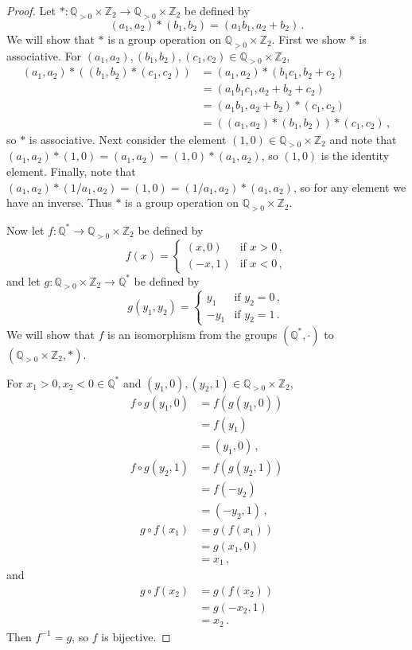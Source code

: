 \documentclass{abrice}
\newcommand{\Z}{\mathbb{Z}}
\newcommand{\Q}{\mathbb{Q}}
\begin{document}
\begin{proof}
  Let $* : \Q_{>0} \times \Z_2 \to \Q_{>0} \times \Z_2$ be defined by
  \[
    (a_1, a_2) * (b_1, b_2) = (a_1 b_1, a_2 + b_2)\, .
  \]
  We will show that $*$ is a group operation on $\Q_{>0} \times \Z_2$. First we
  show $*$ is associative. For
  $(a_1, a_2), (b_1, b_2), (c_1, c_2) \in \Q_{>0} \times \Z_2$,
  \begin{align*}
    (a_1, a_2) * ((b_1, b_2) * (c_1, c_2))
    &= (a_1, a_2) * (b_1 c_1, b_2 + c_2) \\
    &= (a_1 b_1 c_1, a_2 + b_2 + c_2) \\
    &= (a_1 b_1, a_2 + b_2) * (c_1, c_2) \\
    &= ((a_1, a_2) * (b_1, b_2)) * (c_1, c_2)\, ,
  \end{align*}
  so $*$ is associative. Next consider the element $(1,0) \in \Q_{>0} \times
  \Z_2$ and note that $(a_1, a_2) * (1, 0) = (a_1, a_2) = (1,0) * (a_1, a_2)$,
  so $(1,0)$ is the identity element. Finally, note that $(a_1, a_2) * (1/a_1,
  a_2) = (1,0) = (1/a_1, a_2) * (a_1, a_2)$, so for any element we have an
  inverse. Thus $*$ is a group operation on $\Q_{>0} \times \Z_2$.

  Now let  $f : \Q^* \to \Q_{>0} \times \Z_2$ be defined by
  \[
    f(x) =
    \begin{cases}
      (x, 0) & \text{if } x > 0\, , \\
      (-x, 1) & \text{if } x < 0\, ,
    \end{cases}
  \]
  and let $g : \Q_{>0} \times \Z_2 \to \Q^*$ be defined by
  \[
    g(y_1, y_2) =
    \begin{cases}
      y_1 & \text{if } y_2 = 0\, , \\
      -y_1 & \text{if } y_2 = 1\, .
    \end{cases}
  \]
  We will show that $f$ is an isomorphism from the groups $(\Q^*, \cdot)$ to
  $(\Q_{>0} \times \Z_2, *)$.

  For $x_1 > 0, x_2 < 0 \in \Q^*$ and $(y_1, 0), (y_2, 1) \in \Q_{>0} \times
  \Z_2$,
  \begin{align*}
    f \circ g (y_1, 0)
    &= f(g(y_1, 0)) \\
    &= f(y_1) \\
    &= (y_1, 0)\, ,
  \end{align*}
  \begin{align*}
    f \circ g(y_2,1)
    &= f(g(y_2, 1)) \\
    &= f(-y_2) \\
    &= (-y_2,1)\, ,
  \end{align*}
  \begin{align*}
    g \circ f(x_1)
    &= g(f(x_1)) \\
    &= g(x_1, 0) \\
    &= x_1\, ,
  \end{align*}
  and
  \begin{align*}
    g \circ f(x_2)
    &= g(f(x_2)) \\
    &= g(-x_2, 1) \\
    &= x_2\, .
  \end{align*}
  Then $f^{-1} = g$, so $f$ is bijective.


\end{proof}
\end{document}
